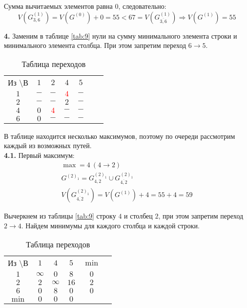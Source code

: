 Сумма вычитаемых элементов равна $0$, следовательно:
\begin{equation*}
V(G_{3,6}^{(1)}) = V(G^{(0)}) + 0 = 55 < 67 = V(G_{\overline{3,6}}^{(1)}) \Rightarrow V(G^{(1)}) = 55
\end{equation*}

\textbf{4.} Заменим в таблице \ref{tab:9} нули на сумму минимального элемента строки и минимального элемента столбца. При этом запретим переход $6 \rightarrow 5$.

\begin{table}[H]
\begin{center}
	\def\tabcolsep{15pt}
	\caption{Таблица переходов}
	\label{tab:10}
	\begin{tabular}{|c||c|c|c|c|c|c|}
		\hline
		Из \textbackslash В & $1$ & $2$ & $4$ & $5$ \\
		\hhline{|=#=|=|=|=|}
		$1$ & $-$ & $-$ & \textcolor{red}{\boldmath$4$} & $-$ \\
		\hline
		$2$ & $-$ & $-$ & $2$ & $-$ \\
		\hline
		$4$ & $0$ & \textcolor{red}{\boldmath$4$} & $-$ & $-$ \\
		\hline
		$6$ & $0$ & $-$ & $-$ & $-$ \\
		\hline
	\end{tabular}
\end{center}
\end{table}

В таблице находится несколько максимумов, поэтому по очереди рассмотрим каждый из возможных путей. \\

\textbf{4.1.} Первый максимум:
\begin{gather*}
\max = 4\ (4 \rightarrow 2) \\
G^{(2)_1} = G_{4,2}^{(2)_1} \cup G_{\overline{4,2}}^{(2)_1} \\
V(G_{\overline{4,2}}^{(2)_1}) = V(G^{(1)}) + 4 = 55 + 4 = 59
\end{gather*}

Вычеркнем из таблицы \ref{tab:9} строку $4$ и столбец $2$, при этом запретим переход $2 \rightarrow 4$. Найдем минимумы для каждого столбца и каждой строки.

\begin{table}[H]
\begin{center}
	\def\tabcolsep{15pt}
	\caption{Таблица переходов}
	\label{tab:11}
	\begin{tabular}{|c||c|c|c|c|c|}
		\hline
		Из \textbackslash В & $1$ & $4$ & $5$ & $\min$ \\
		\hhline{|=#=|=|=|=|}
		$1$ & $\infty$ & $0$ & $8$ & $0$ \\
		\hline
		$2$ & $2$ & $\infty$ & $16$ & $2$ \\
		\hline
		$6$ & $0$ & $8$ & $0$ & $0$ \\
		\hhline{|=#=|=|=|=|}
		$\min$ & $0$ & $0$ & $0$ & \\ 
		\hline
	\end{tabular}
\end{center}
\end{table}

